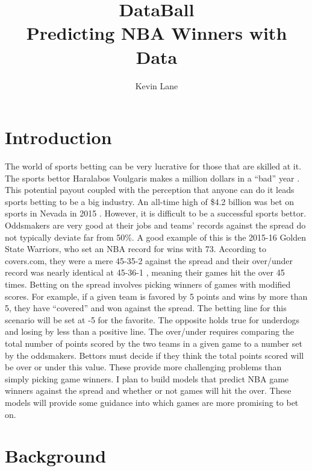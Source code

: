 \documentclass{article}
\title{DataBall \\ Predicting NBA Winners with Data}
\author{Kevin Lane}
\begin{document}
\maketitle

\section{Introduction}

The world of sports betting can be very lucrative for those that are skilled at it. The sports bettor Haralabos Voulgaris makes a million dollars in a ``bad'' year \cite{silver}. This potential payout coupled with the perception that anyone can do it leads sports betting to be a big industry. An all-time high of \$4.2 billion was bet on sports in Nevada in 2015 \cite{espn}. However, it is difficult to be a successful sports bettor. Oddsmakers are very good at their jobs and teams' records against the spread do not typically deviate far from 50\%. A good example of this is the 2015-16 Golden State Warriors, who set an NBA record for wins with 73. According to covers.com, they were a mere 45-35-2 against the spread and their over/under record was nearly identical at 45-36-1 \cite{covers}, meaning their games hit the over 45 times. Betting on the spread involves picking winners of games with modified scores. For example, if a given team is favored by 5 points and wins by more than 5, they have ``covered'' and won against the spread. The betting line for this scenario will be set at -5 for the favorite. The opposite holds true for underdogs and losing by less than a positive line. The over/under requires comparing the total number of points scored by the two teams in a given game to a number set by the oddsmakers. Bettors must decide if they think the total points scored will be over or under this value. These provide more challenging problems than simply picking game winners. I plan to build models that predict NBA game winners against the spread and whether or not games will hit the over. These models will provide some guidance into which games are more promising to bet on.

\section{Background}
\end{document}
